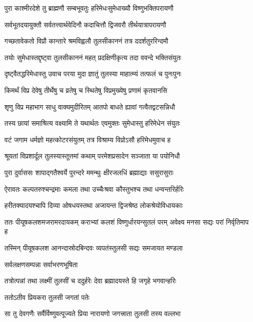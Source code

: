 \twolineshloka
{पुरा काश्मीरदेशे तु ब्राह्मणौ सम्बभूवतुः}
{हरिमेधःसुमेधाख्यौ विष्णुभक्तिपरायणौ} %

\twolineshloka
{सर्वभूतदयायुक्तौ सर्वतत्त्वार्थवेदिनौ}
{कदाचित्तौ द्विजवरौ तीर्थयात्रापरायणौ} %

\twolineshloka
{गच्छतावेकतो विप्रौ कान्तारे श्रमविह्वलौ}
{तुलसीकाननं तत्र ददर्शतुररिन्दमौ} %

\twolineshloka
{तयोः सुमेधास्तद्दृष्ट्वा तुलसीकाननं महत्}
{प्रदक्षिणीकृत्य तदा ववन्दे भक्तिसंयुतः} %

\twolineshloka
{दृष्ट्वैतद्धरिमेधास्तु उवाच परया मुदा}
{ज्ञातुं तुलस्या माहात्म्यं तत्फलं च पुनःपुनः} %

\twolineshloka
{किमर्थं विप्र देवेषु तीर्थेषु च व्रतेषु च}
{स्थितेषु विप्रमुख्येषु प्रणामं कृतवानसि} %


\twolineshloka
{शृणु विप्र महाभाग साधु वाक्यमुदीरितम्}
{आतपो बाधते ह्यावां गत्वैतद्वटसन्निधौ} %

\twolineshloka
{तस्य छायां समाश्रित्य वक्ष्यामि ते यथार्थतः}
{एवमुक्तः सुमेधास्तु हरिमेधेन संयुतः} %

\twolineshloka
{वटं जगाम धर्मज्ञो महत्कोटरसंयुतम्}
{तत्र विश्राम्य विप्रोऽसौ हरिमेधमुवाच ह} %

\twolineshloka
{श्रूयतां विप्रशार्दूल तुलस्यास्तूत्तमां कथाम्}
{परमेशप्रसादेन सञ्जाता या पयोनिधौ} %

\twolineshloka
{पुरा दुर्वाससः शापाद्गतैश्वर्ये पुरन्दरे}
{ममन्थुः क्षीरजलधिं ब्रह्माद्याः ससुरासुराः} %

\twolineshloka
{ऐरावतः कल्पतरुश्चन्द्रमाः कमला तथा}
{उच्चैःश्रवा कौस्तुभश्च तथा धन्वन्तरिर्हरिः} %

\twolineshloka
{हरीतक्यादयश्चापि दिव्या ओषधयस्तथा}
{अजायन्त द्विजश्रेष्ठ लोकश्रेयोविधायकाः} %

\threelineshloka
{ततः पीयूषकलशमजरामरदायकम्}
{कराभ्यां कलशं विष्णुर्धारयन्सुतलं परम्}
{अवेक्ष्य मनसा सद्यः परां निर्वृतिमाप ह} %

\twolineshloka
{तस्मिन् पीयूषकलश आनन्दास्रोदबिन्दवः}
{व्यपतंस्तुलसी सद्यः समजायत मण्डला} %


\onelineshloka
{सर्वलक्षणसम्पन्ना सर्वाभरणभूषिता} %

\twolineshloka
{तत्रोत्पन्नां तथा लक्ष्मीं तुलसीं च ददुर्हरेः}
{देवा ब्रह्मादयस्ते हि जगृहे भगवान्हरिः} %


\onelineshloka
{ततोऽतीव प्रियकरा तुलसी जगतां पतेः} %

\twolineshloka
{सा तु देवगणैः सर्वैर्विष्णुवत्पूज्यते प्रिया}
{नारायणो जगत्त्राता तुलसी तस्य वल्लभा} %


